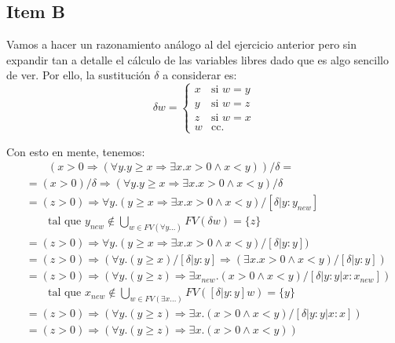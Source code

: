\documentclass{article}
\begin{document}
\subsection*{Item B}
Vamos a hacer un razonamiento análogo al del ejercicio anterior pero sin expandir tan a detalle el cálculo de las variables libres dado que es algo sencillo de ver.
Por ello, la sustitución $\delta$ a considerar es:
\begin{equation*}
	\delta w = \begin{cases}
		x & \text{si } w = y \\
		y & \text{si } w = z \\
		z & \text{si } w = x \\
		w & \text{cc.}
	\end{cases}
\end{equation*}

Con esto en mente, tenemos:
\begin{equation*}
	\begin{aligned}
		 & \qquad (x > 0 \Rightarrow (\forall y. y \geq x \Rightarrow \exists x. x > 0 \land x < y))/\delta =                            \\
		 & = (x > 0)/\delta \Rightarrow (\forall y. y \geq x \Rightarrow \exists x. x > 0 \land x < y)/\delta                            \\
		 & = (z > 0) \Rightarrow \forall y. (y \geq x \Rightarrow \exists x. x > 0 \land x < y)/[\delta | y : y_{new}]                   \\
		 & \qquad \text{tal que } y_{new} \notin \bigcup_{w \in FV(\forall y \dots)} FV(\delta w) = \{z\}                                \\
		 & = (z > 0) \Rightarrow \forall y. (y \geq x \Rightarrow \exists x. x > 0 \land x < y)/[\delta | y : y])                        \\
		 & = (z > 0) \Rightarrow (\forall y. (y \geq x)/[\delta | y : y] \Rightarrow (\exists x. x > 0 \land x < y)/[\delta | y : y])    \\
		 & = (z > 0) \Rightarrow (\forall y. (y \geq z) \Rightarrow \exists x_{new}. (x > 0 \land x < y)/[\delta | y : y | x : x_{new}]) \\
		 & \qquad \text{tal que } x_{new} \notin \bigcup_{w \in FV(\exists x \dots)} FV([\delta | y : y] w) = \{y\}                      \\
		 & = (z > 0) \Rightarrow (\forall y. (y \geq z) \Rightarrow \exists x. (x > 0 \land x < y)/[\delta | y : y | x : x])             \\
		 & = (z > 0) \Rightarrow (\forall y. (y \geq z) \Rightarrow \exists x. (x > 0 \land x < y))
	\end{aligned}
\end{equation*}
\end{document}
